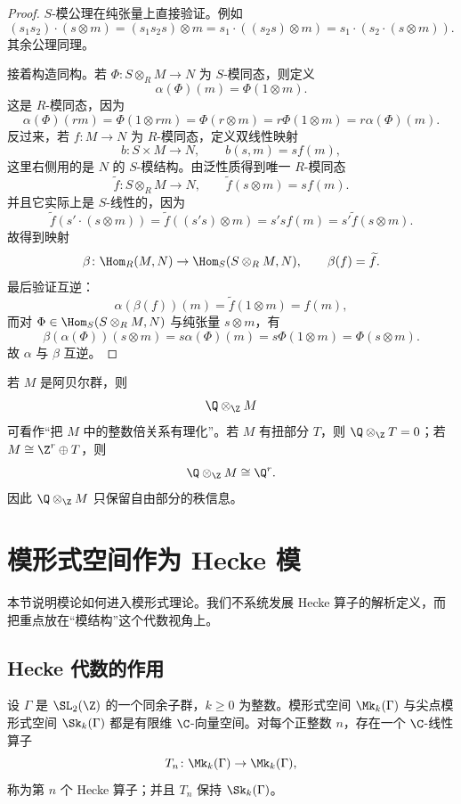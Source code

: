 \begin{proof}
$S$-模公理在纯张量上直接验证。例如
\[
(s_1s_2)\cdot (s\otimes m)=(s_1s_2s)\otimes m=s_1\cdot ((s_2s)\otimes m)=s_1\cdot (s_2\cdot (s\otimes m)).
\]
其余公理同理。

接着构造同构。若 $\Phi\colon S\otimes_R M\to N$ 为 $S$-模同态，则定义
\[
\alpha(\Phi)(m)=\Phi(1\otimes m).
\]
这是 $R$-模同态，因为
\[
\alpha(\Phi)(rm)=\Phi(1\otimes rm)=\Phi(r\otimes m)=r\Phi(1\otimes m)=r\alpha(\Phi)(m).
\]
反过来，若 $f\colon M\to N$ 为 $R$-模同态，定义双线性映射
\[
b\colon S\times M\to N,
\qquad b(s,m)=s f(m),
\]
这里右侧用的是 $N$ 的 $S$-模结构。由泛性质得到唯一 $R$-模同态
\[
\widetilde f\colon S\otimes_R M\to N,
\qquad \widetilde f(s\otimes m)=sf(m).
\]
并且它实际上是 $S$-线性的，因为
\[
\widetilde f(s'\cdot (s\otimes m))=\widetilde f((s's)\otimes m)=s'sf(m)=s'\widetilde f(s\otimes m).
\]
故得到映射
\[
\beta\colon \Hom_R(M,N)\to \Hom_S(S\otimes_R M,N),\qquad \beta(f)=\widetilde f.
\]
最后验证互逆：
\[
\alpha(\beta(f))(m)=\widetilde f(1\otimes m)=f(m),
\]
而对 $\Phi\in \Hom_S(S\otimes_R M,N)$ 与纯张量 $s\otimes m$，有
\[
\beta(\alpha(\Phi))(s\otimes m)=s\alpha(\Phi)(m)=s\Phi(1\otimes m)=\Phi(s\otimes m).
\]
故 $\alpha$ 与 $\beta$ 互逆。
\end{proof}

\begin{example}
若 $M$ 是阿贝尔群，则
\[
\Q\otimes_\Z M
\]
可看作“把 $M$ 中的整数倍关系有理化”。若 $M$ 有扭部分 $T$，则 $\Q\otimes_\Z T=0$；若 $M\cong \Z^r\oplus T$，则
\[
\Q\otimes_\Z M\cong \Q^r.
\]
因此 $\Q\otimes_\Z M$ 只保留自由部分的秩信息。
\end{example}

\section{模形式空间作为 Hecke 模}

本节说明模论如何进入模形式理论。我们不系统发展 Hecke 算子的解析定义，而把重点放在“模结构”这个代数视角上。

\subsection{Hecke 代数的作用}

设 $\Gamma$ 是 $\SL_2(\Z)$ 的一个同余子群，$k\ge 0$ 为整数。模形式空间 $\Mk_k(\Gamma)$ 与尖点模形式空间 $\Sk_k(\Gamma)$ 都是有限维 $\C$-向量空间。对每个正整数 $n$，存在一个 $\C$-线性算子
\[
T_n\colon \Mk_k(\Gamma)\to \Mk_k(\Gamma),
\]
称为第 $n$ 个 Hecke 算子；并且 $T_n$ 保持 $\Sk_k(\Gamma)$。

